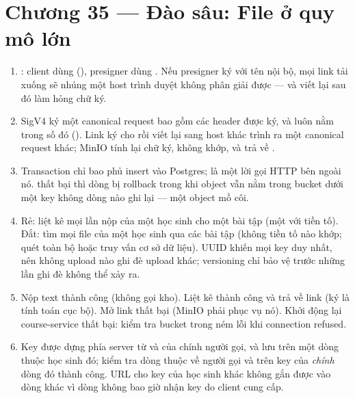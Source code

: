 \section*{Chương 35 --- Đào sâu: File ở quy mô lớn}
\begin{enumerate}
  \item {}: client dùng 
  (), presigner dùng . Nếu
  presigner ký với tên nội bộ, mọi link tải xuống sẽ nhúng một host trình
  duyệt không phân giải được --- và viết lại sau đó làm hỏng chữ ký.
  \item SigV4 ký một canonical request bao gồm các header được ký, và
   luôn nằm trong số đó ().
  Link ký cho  rồi viết lại sang host khác trình ra
  một canonical request khác; MinIO tính lại chữ ký, không khớp, và trả
  về .
  \item Transaction chỉ bao phủ insert vào Postgres; 
  là một lời gọi HTTP bên ngoài nó.  thất bại thì dòng bị
  rollback trong khi object vẫn nằm trong bucket dưới một key không
  dòng nào ghi lại --- một object mồ côi.
  \item Rẻ: liệt kê mọi lần nộp của một học sinh cho một bài tập (một
   với tiền tố). Đắt: tìm mọi file của một học sinh
  qua các bài tập (không tiền tố nào khớp; quét toàn bộ hoặc truy vấn
  cơ sở dữ liệu). UUID khiến mọi key duy nhất, nên không upload nào ghi
  đè upload khác; versioning chỉ bảo vệ trước những lần ghi đè không
  thể xảy ra.
  \item Nộp text thành công (không gọi kho). Liệt kê thành công và trả
  về link (ký là tính toán cục bộ). Mở link thất bại (MinIO phải phục
  vụ nó). Khởi động lại course-service thất bại: kiểm tra bucket trong
   ném lỗi khi connection refused.
  \item Key được dựng phía server từ  và
   của chính người gọi, và lưu trên một dòng
   thuộc học sinh đó;  kiểm tra
  dòng thuộc về người gọi và  trên key của \emph{chính} dòng
  đó thành công. URL cho key của học sinh khác không gắn được vào dòng
  khác vì dòng không bao giờ nhận key do client cung cấp.
\end{enumerate}

